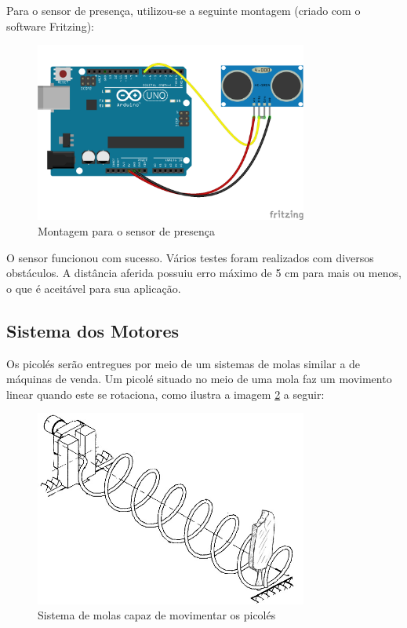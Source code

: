 Para o sensor de presença, utilizou-se a seguinte montagem (criado com o software Fritzing):

\begin{figure}[H]
	\centering
    \includegraphics[width=0.8\textwidth]{figuras/fritzing_presenca}
    \caption{Montagem para o sensor de presença}
    \label{fig:fritzing_presenca}
\end{figure}

O sensor funcionou com sucesso. Vários testes foram realizados com diversos obstáculos. A distância aferida possuiu erro máximo de 5 cm para mais ou menos, o que é aceitável para sua aplicação.

\subsection{Sistema dos Motores}
Os picolés serão entregues por meio de um sistemas de molas similar a de máquinas de venda. Um picolé situado no meio de uma mola faz um movimento linear quando este se rotaciona, como ilustra a imagem \ref{fig:sistema_molas} a seguir:

\begin{figure}[H]
	\centering
    \includegraphics[width=0.8\textwidth]{figuras/sistema_molas}
    \caption{Sistema de molas capaz de movimentar os picolés}
    \label{fig:sistema_molas}
\end{figure}

